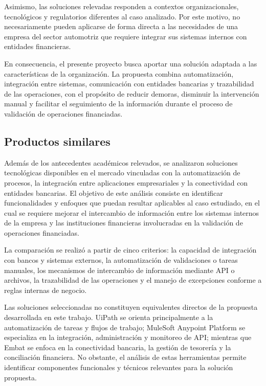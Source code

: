 Asimismo, las soluciones relevadas responden a contextos organizacionales, tecnológicos y regulatorios diferentes al caso analizado. Por este motivo, no necesariamente pueden aplicarse de forma directa a las necesidades de una empresa del sector automotriz que requiere integrar sus sistemas internos con entidades financieras.

En consecuencia, el presente proyecto busca aportar una solución adaptada a las características de la organización. La propuesta combina automatización, integración entre sistemas, comunicación con entidades bancarias y trazabilidad de las operaciones, con el propósito de reducir demoras, disminuir la intervención manual y facilitar el seguimiento de la información durante el proceso de validación de operaciones financiadas.

\subsection{Productos similares}

Además de los antecedentes académicos relevados, se analizaron soluciones tecnológicas disponibles en el mercado vinculadas con la automatización de procesos, la integración entre aplicaciones empresariales y la conectividad con entidades bancarias. El objetivo de este análisis consiste en identificar funcionalidades y enfoques que puedan resultar aplicables al caso estudiado, en el cual se requiere mejorar el intercambio de información entre los sistemas internos de la empresa y las instituciones financieras involucradas en la validación de operaciones financiadas.

La comparación se realizó a partir de cinco criterios: la capacidad de integración con bancos y sistemas externos, la automatización de validaciones o tareas manuales, los mecanismos de intercambio de información mediante API o archivos, la trazabilidad de las operaciones y el manejo de excepciones conforme a reglas internas de negocio.

Las soluciones seleccionadas no constituyen equivalentes directos de la propuesta desarrollada en este trabajo. UiPath se orienta principalmente a la automatización de tareas y flujos de trabajo; MuleSoft Anypoint Platform se especializa en la integración, administración y monitoreo de API; mientras que Embat se enfoca en la conectividad bancaria, la gestión de tesorería y la conciliación financiera. No obstante, el análisis de estas herramientas permite identificar componentes funcionales y técnicos relevantes para la solución propuesta.

